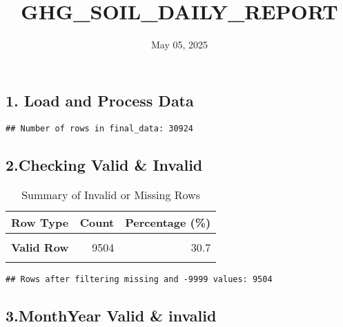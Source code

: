 \documentclass[
]{article}
\title{GHG\_SOIL\_DAILY\_REPORT}
\author{}
\date{\vspace{-2.5em}May 05, 2025}
\begin{document}
\maketitle

{
\setcounter{tocdepth}{2}
\tableofcontents
}
\hypertarget{load-and-process-data}{%
\subsection{1. Load and Process Data}\label{load-and-process-data}}

\begin{verbatim}
## Number of rows in final_data: 30924
\end{verbatim}

\hypertarget{checking-valid-invalid}{%
\subsection{2.Checking Valid \& Invalid}\label{checking-valid-invalid}}

\begin{longtable}[t]{>{}lrr}
\caption{\label{tab:check-invalid}Summary of Invalid or Missing Rows}\\
\toprule
Row Type & Count & Percentage (\%)\\
\midrule
\textbf{\cellcolor{gray!10}{Has -9999 Only}} & \cellcolor{gray!10}{21416} & \cellcolor{gray!10}{69.3}\\
\textbf{Valid Row} & 9504 & 30.7\\
\textbf{\cellcolor{gray!10}{Has -9999 and Missing}} & \cellcolor{gray!10}{3} & \cellcolor{gray!10}{0.0}\\
\bottomrule
\end{longtable}

\begin{verbatim}
## Rows after filtering missing and -9999 values: 9504
\end{verbatim}

\hypertarget{monthyear-valid-invalid}{%
\subsection{3.MonthYear Valid \&
invalid}\label{monthyear-valid-invalid}}
\end{document}
